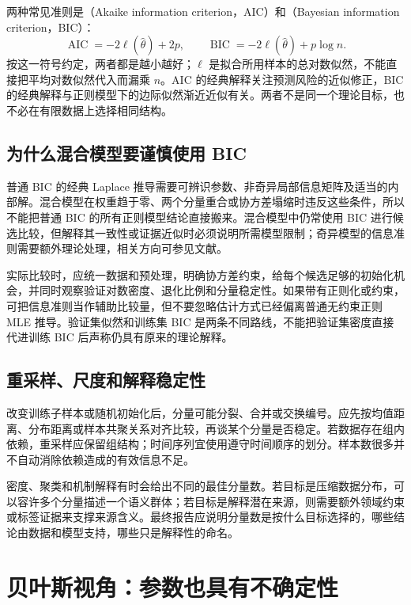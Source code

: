 \documentclass[UTF8]{ctexart}
\begin{document}
两种常见准则是（Akaike information criterion，AIC）和（Bayesian information criterion，BIC）：
\begin{equation}
\operatorname{AIC}=-2\ell(\widehat\theta)+2p,\qquad
\operatorname{BIC}=-2\ell(\widehat\theta)+p\log n.
\label{eq:gmm-information-criteria}
\end{equation}
按这一符号约定，两者都是越小越好；$\ell$ 是拟合所用样本的总对数似然，不能直接把平均对数似然代入而漏乘 $n$。AIC 的经典解释关注预测风险的近似修正，BIC 的经典解释与正则模型下的边际似然渐近近似有关。两者不是同一个理论目标，也不必在有限数据上选择相同结构。

\subsection{为什么混合模型要谨慎使用 BIC}
普通 BIC 的经典 Laplace 推导需要可辨识参数、非奇异局部信息矩阵及适当的内部解。混合模型在权重趋于零、两个分量重合或协方差塌缩时违反这些条件，所以不能把普通 BIC 的所有正则模型结论直接搬来。混合模型中仍常使用 BIC 进行候选比较，但解释其一致性或证据近似时必须说明所需模型限制；奇异模型的信息准则需要额外理论处理，相关方向可参见文献\cite{drton2013}。

实际比较时，应统一数据和预处理，明确协方差约束，给每个候选足够的初始化机会，并同时观察验证对数密度、退化比例和分量稳定性。如果带有正则化或约束，可把信息准则当作辅助比较量，但不要忽略估计方式已经偏离普通无约束正则 MLE 推导。验证集似然和训练集 BIC 是两条不同路线，不能把验证集密度直接代进训练 BIC 后声称仍具有原来的理论解释。

\subsection{重采样、尺度和解释稳定性}
改变训练子样本或随机初始化后，分量可能分裂、合并或交换编号。应先按均值距离、分布距离或样本共聚关系对齐比较，再谈某个分量是否稳定。若数据存在组内依赖，重采样应保留组结构；时间序列宜使用遵守时间顺序的划分。样本数很多并不自动消除依赖造成的有效信息不足。

密度、聚类和机制解释有时会给出不同的最佳分量数。若目标是压缩数据分布，可以容许多个分量描述一个语义群体；若目标是解释潜在来源，则需要额外领域约束或标签证据来支撑来源含义。最终报告应说明分量数是按什么目标选择的，哪些结论由数据和模型支持，哪些只是解释性的命名。

\section{贝叶斯视角：参数也具有不确定性}
\label{sec:gmm-bayesian}
\end{document}
